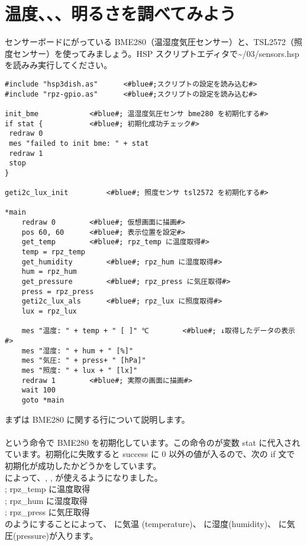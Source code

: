 \section{温度、、、明るさを調べてみよう}\label{sec:sensors}
センサーボードにがっている BME280（温湿度気圧センサー）と、TSL2572（照度センサー）を使ってみましょう。HSP スクリプトエディタで\textasciitilde /03/sensors.hsp を読みみ実行してください。\\

\begin{lstlisting}[caption=\textasciitilde/03/sensors.hsp,label=sensors.hsp]
#include "hsp3dish.as"		<#blue#;スクリプトの設定を読み込む#>
#include "rpz-gpio.as"		<#blue#;スクリプトの設定を読み込む#>

init_bme			<#blue#; 温湿度気圧センサ bme280 を初期化する#>
if stat { 			<#blue#; 初期化成功チェック#>
 redraw 0
 mes "failed to init bme: " + stat
 redraw 1
 stop
}

geti2c_lux_init 		<#blue#; 照度センサ tsl2572 を初期化する#>

*main
	redraw 0 		<#blue#; 仮想画面に描画#>
	pos 60, 60 		<#blue#; 表示位置を設定#>
	get_temp		<#blue#; rpz_temp に温度取得#>
	temp = rpz_temp
	get_humidity		<#blue#; rpz_hum に湿度取得#>
	hum = rpz_hum
	get_pressure		<#blue#; rpz_press に気圧取得#>
	press = rpz_press
	geti2c_lux_als		<#blue#; rpz_lux に照度取得#>
	lux = rpz_lux

	mes "温度: " + temp + " [ ]" ℃		<#blue#; ↓取得したデータの表示#>
	mes "湿度: " + hum + " [%]"
	mes "気圧: " + press+ " [hPa]"
	mes "照度: " + lux + " [lx]"
	redraw 1		<#blue#; 実際の画面に描画#>
	wait 100
	goto *main
\end{lstlisting}

まずは BME280 に関する行について説明します。\\
\\
という命令で BME280 を初期化しています。この命令のが変数 stat に代入されています。初期化に失敗すると success に 0 以外の値が入るので、次の if 文で初期化が成功したかどうかをしています。\\
 によって、, ,  が使えるようになりました。\\
	; rpz\_temp に温度取得\\
	; rpz\_hum に湿度取得\\
	; rpz\_press に気圧取得\\
のようにすることによって、 に気温 (temperature)、  に湿度(humidity)、 に気圧(pressure)が入ります。

